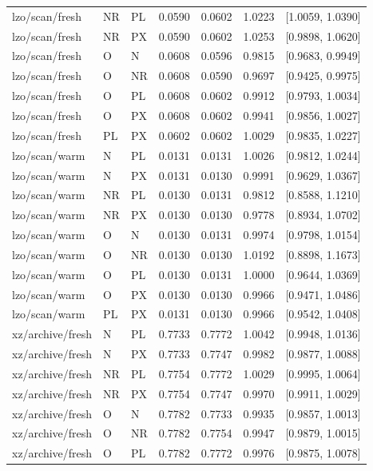 \begin{longtable}{lllrrrr}
lzo/scan/fresh & NR & PL & 0.0590 & 0.0602 & 1.0223 & [1.0059, 1.0390] \\
lzo/scan/fresh & NR & PX & 0.0590 & 0.0602 & 1.0253 & [0.9898, 1.0620] \\
lzo/scan/fresh & O & N & 0.0608 & 0.0596 & 0.9815 & [0.9683, 0.9949] \\
lzo/scan/fresh & O & NR & 0.0608 & 0.0590 & 0.9697 & [0.9425, 0.9975] \\
lzo/scan/fresh & O & PL & 0.0608 & 0.0602 & 0.9912 & [0.9793, 1.0034] \\
lzo/scan/fresh & O & PX & 0.0608 & 0.0602 & 0.9941 & [0.9856, 1.0027] \\
lzo/scan/fresh & PL & PX & 0.0602 & 0.0602 & 1.0029 & [0.9835, 1.0227] \\
lzo/scan/warm & N & PL & 0.0131 & 0.0131 & 1.0026 & [0.9812, 1.0244] \\
lzo/scan/warm & N & PX & 0.0131 & 0.0130 & 0.9991 & [0.9629, 1.0367] \\
lzo/scan/warm & NR & PL & 0.0130 & 0.0131 & 0.9812 & [0.8588, 1.1210] \\
lzo/scan/warm & NR & PX & 0.0130 & 0.0130 & 0.9778 & [0.8934, 1.0702] \\
lzo/scan/warm & O & N & 0.0130 & 0.0131 & 0.9974 & [0.9798, 1.0154] \\
lzo/scan/warm & O & NR & 0.0130 & 0.0130 & 1.0192 & [0.8898, 1.1673] \\
lzo/scan/warm & O & PL & 0.0130 & 0.0131 & 1.0000 & [0.9644, 1.0369] \\
lzo/scan/warm & O & PX & 0.0130 & 0.0130 & 0.9966 & [0.9471, 1.0486] \\
lzo/scan/warm & PL & PX & 0.0131 & 0.0130 & 0.9966 & [0.9542, 1.0408] \\
xz/archive/fresh & N & PL & 0.7733 & 0.7772 & 1.0042 & [0.9948, 1.0136] \\
xz/archive/fresh & N & PX & 0.7733 & 0.7747 & 0.9982 & [0.9877, 1.0088] \\
xz/archive/fresh & NR & PL & 0.7754 & 0.7772 & 1.0029 & [0.9995, 1.0064] \\
xz/archive/fresh & NR & PX & 0.7754 & 0.7747 & 0.9970 & [0.9911, 1.0029] \\
xz/archive/fresh & O & N & 0.7782 & 0.7733 & 0.9935 & [0.9857, 1.0013] \\
xz/archive/fresh & O & NR & 0.7782 & 0.7754 & 0.9947 & [0.9879, 1.0015] \\
xz/archive/fresh & O & PL & 0.7782 & 0.7772 & 0.9976 & [0.9875, 1.0078] \\

\end{longtable}
